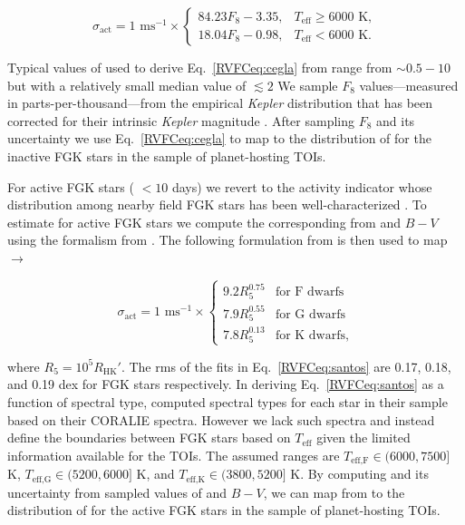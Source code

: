 \begin{equation}
  \sigma_{\text{act}} = 1 \text{ m} \text{s}^{-1} \times
  \begin{cases}
    84.23 F_8 - 3.35, & T_{\text{eff}} \geq 6000 \text{ K}, \\
    18.04 F_8 - 0.98, & T_{\text{eff}} < 6000 \text{ K}.
  \end{cases} \label{RVFCeq:cegla}
\end{equation}

\noindent Typical values of \sigact{} used to derive Eq.~\ref{RVFCeq:cegla} from \cite{saar03} range from
$\sim 0.5-10$ \mps{} but with a relatively small median value of $\lesssim 2$ 
We sample $F_8$ values---measured in parts-per-thousand---from the empirical \emph{Kepler} distribution
that has been corrected for their intrinsic \emph{Kepler} magnitude \citep{bastien13}. After sampling $F_8$ and its
uncertainty we use Eq.~\ref{RVFCeq:cegla} to map to the distribution of \sigact{} for the inactive FGK stars in
the sample of planet-hosting TOIs.

For active FGK stars (\prot{} $<10$ days) we revert to the \Rhk{} activity indicator \citep{noyes84} 
whose distribution among nearby field FGK stars
has been well-characterized \citep{henry96, santos00, wright04, hall07, isaacson10, lovis11}. To estimate \sigact{}
for active FGK stars we compute the corresponding \Rhk{} from \prot{} and $B-V$ using the formalism from
\cite{noyes84}. The following formulation from \cite{santos00} is then used to map \Rhk{} $\to$ \sigact{:}

\begin{equation}
  \sigma_{\text{act}} = 1 \text{ m} \text{s}^{-1} \times
  \begin{cases}
    9.2 R_5^{0.75} & \text{for F dwarfs} \\
    7.9 R_5^{0.55} & \text{for G dwarfs} \\
    7.8 R_5^{0.13} & \text{for K dwarfs},
  \end{cases} \label{RVFCeq:santos}
\end{equation}  

\noindent where $R_5 = 10^5 R_{\text{HK}}'$.
The rms of the fits in Eq.~\ref{RVFCeq:santos} are 0.17, 0.18, and 0.19 dex for FGK stars respectively.
In deriving Eq.~\ref{RVFCeq:santos} as a function of spectral type, \cite{santos00} computed
spectral types for each star in their sample based on their CORALIE spectra. However we lack such spectra and
instead define the boundaries between
FGK stars based on $T_{\text{eff}}$ given the limited information available for the TOIs. The assumed ranges
are $T_{\text{eff,F}} \in (6000,7500]$ K, $T_{\text{eff,G}} \in (5200,6000]$ K, and $T_{\text{eff,K}} \in (3800,5200]$ K.
      By computing \Rhk{} and its uncertainty from sampled values of \prot{} and $B-V$, we can map from \Rhk{} to the
      distribution of \sigact{} for the active FGK stars in the sample of planet-hosting TOIs.

